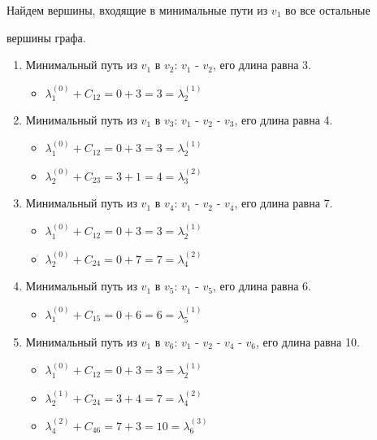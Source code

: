 \documentclass{article}
\begin{document}
\par
\hspace{2mm}
Найдем вершины, входящие в минимальные пути из $v_1$ во все остальные
\par
\hspace{4mm}вершины графа.
\begin{enumerate} 
	\setlength{\itemindent}{6mm}
	\item Минимальный путь из $v_1$ в $v_2$: $v_1$ - $v_2$, его длина равна 3.
	\begin{itemize} 
		\setlength{\itemindent}{6mm}
		\item $\lambda_1^{(0)} + C_{12} = 0 + 3 = 3 = \lambda_2^{(1)}$
	\end{itemize} 
	\item Минимальный путь из $v_1$ в $v_3$: $v_1$ - $v_2$ - $v_3$, его длина равна 4.
	\begin{itemize} 
		\setlength{\itemindent}{6mm}
		\item $\lambda_1^{(0)} + C_{12} = 0 + 3 = 3 = \lambda_2^{(1)}$
		\item $\lambda_2^{(0)} + C_{23} = 3 + 1 = 4 = \lambda_3^{(2)}$
	\end{itemize}
	\item Минимальный путь из $v_1$ в $v_4$: $v_1$ - $v_2$ - $v_4$, его длина равна 7.
	\begin{itemize} 
		\setlength{\itemindent}{6mm}
		\item $\lambda_1^{(0)} + C_{12} = 0 + 3 = 3 = \lambda_2^{(1)}$
		\item $\lambda_2^{(0)} + C_{24} = 0 + 7 = 7 = \lambda_4^{(2)}$
	\end{itemize} 
	\item Минимальный путь из $v_1$ в $v_5$: $v_1$ - $v_5$, его длина равна 6.
	\begin{itemize} 
		\setlength{\itemindent}{6mm}
		\item $\lambda_1^{(0)} + C_{15} = 0 + 6 = 6 = \lambda_5^{(1)}$
	\end{itemize}
	\item Минимальный путь из $v_1$ в $v_6$: $v_1$ - $v_2$ - $v_4$ - $v_6$, его длина равна 10.
	\begin{itemize} 
		\setlength{\itemindent}{6mm}
		\item $\lambda_1^{(0)} + C_{12} = 0 + 3 = 3 = \lambda_2^{(1)}$
		\item $\lambda_2^{(1)} + C_{24} = 3 + 4 = 7 = \lambda_4^{(2)}$
		\item $\lambda_4^{(2)} + C_{46} = 7 + 3 = 10 = \lambda_6^{(3)}$
	\end{itemize} 

\end{enumerate}
\end{document}
